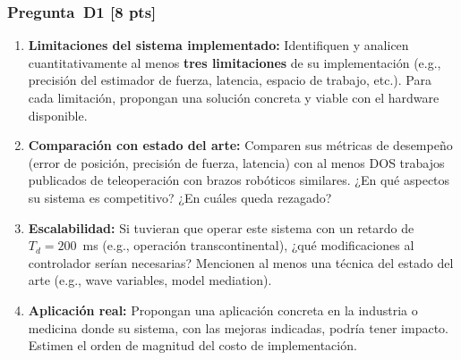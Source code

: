 \documentclass[journal,10pt,twoside]{IEEEtran}
\newcommand{\pts}[1]{\textbf{\color{tec_red}[#1 pts]}}
\begin{document}
\subsubsection*{Pregunta~D1 \pts{8}}
\begin{enumerate}[label=(\alph*)]
  \item \textbf{Limitaciones del sistema implementado:}
        Identifiquen y analicen cuantitativamente al menos \textbf{tres
        limitaciones} de su implementación (e.g., precisión del
        estimador de fuerza, latencia, espacio de trabajo, etc.).
        Para cada limitación, propongan una solución concreta y
        viable con el hardware disponible.
  \item \textbf{Comparación con estado del arte:}
        Comparen sus métricas de desempeño (error de posición,
        precisión de fuerza, latencia) con al menos DOS trabajos
        publicados de teleoperación con brazos robóticos similares.
        ¿En qué aspectos su sistema es competitivo? ¿En cuáles
        queda rezagado?
  \item \textbf{Escalabilidad:} Si tuvieran que operar este sistema
        con un retardo de $T_d = 200$~ms (e.g., operación
        transcontinental), ¿qué modificaciones al controlador
        serían necesarias? Mencionen al menos una técnica
        del estado del arte (e.g., wave variables, model mediation).
  \item \textbf{Aplicación real:} Propongan una aplicación concreta
        en la industria o medicina donde su sistema, con las mejoras
        indicadas, podría tener impacto. Estimen el orden de magnitud
        del costo de implementación.
\end{enumerate}
\end{document}
